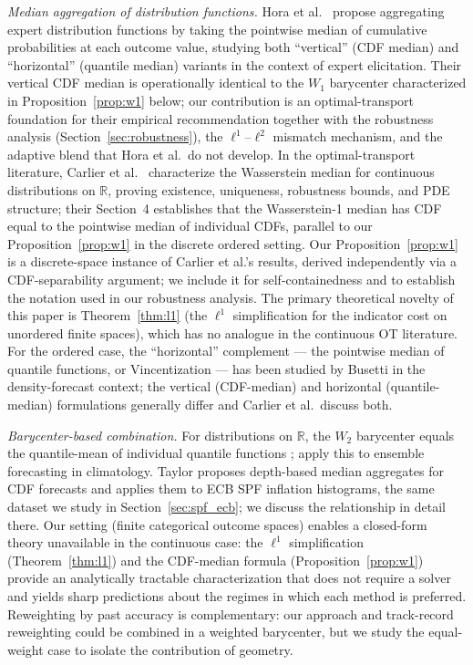 \textit{Median aggregation of distribution functions.}  Hora et al.\ \cite{hora13} propose aggregating expert distribution functions by taking the pointwise median of cumulative probabilities at each outcome value, studying both ``vertical'' (CDF median) and ``horizontal'' (quantile median) variants in the context of expert elicitation.  Their vertical CDF median is operationally identical to the $W_1$ barycenter characterized in Proposition~\ref{prop:w1} below; our contribution is an optimal-transport foundation for their empirical recommendation together with the robustness analysis (Section~\ref{sec:robustness}), the $\ell^1$--$\ell^2$ mismatch mechanism, and the adaptive blend that Hora et al.\ do not develop.  In the optimal-transport literature, Carlier et al.\ \cite{carlier23} characterize the Wasserstein median for continuous distributions on $\mathbb{R}$, proving existence, uniqueness, robustness bounds, and PDE structure; their Section~4 establishes that the Wasserstein-1 median has CDF equal to the pointwise median of individual CDFs, parallel to our Proposition~\ref{prop:w1} in the discrete ordered setting.  Our Proposition~\ref{prop:w1} is a discrete-space instance of Carlier et al.'s results, derived independently via a CDF-separability argument; we include it for self-containedness and to establish the notation used in our robustness analysis.  The primary theoretical novelty of this paper is Theorem~\ref{thm:l1} (the $\ell^1$ simplification for the indicator cost on unordered finite spaces), which has no analogue in the continuous OT literature.  For the ordered case, the ``horizontal'' complement --- the pointwise median of quantile functions, or Vincentization --- has been studied by Busetti \cite{busetti17} in the density-forecast context; the vertical (CDF-median) and horizontal (quantile-median) formulations generally differ and Carlier et al.\ discuss both.

\textit{Barycenter-based combination.}  For distributions on $\mathbb{R}$, the $W_2$ barycenter equals the quantile-mean of individual quantile functions \cite{agueh2011barycenters}; \cite{lecoz23} apply this to ensemble forecasting in climatology.  Taylor \cite{taylor26} proposes depth-based median aggregates for CDF forecasts and applies them to ECB SPF inflation histograms, the same dataset we study in Section~\ref{sec:spf_ecb}; we discuss the relationship in detail there.  Our setting (finite categorical outcome spaces) enables a closed-form theory unavailable in the continuous case: the $\ell^1$ simplification (Theorem~\ref{thm:l1}) and the CDF-median formula (Proposition~\ref{prop:w1}) provide an analytically tractable characterization that does not require a solver and yields sharp predictions about the regimes in which each method is preferred.  Reweighting by past accuracy \cite{clemen89,timmermann06,wang23} is complementary: our approach and track-record reweighting could be combined in a weighted barycenter, but we study the equal-weight case to isolate the contribution of geometry.

